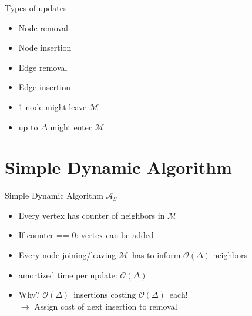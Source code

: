 \documentclass{beamer}
\newcommand{\simple}{$\mathcal{A}_S$}
\newcommand{\M}{$\mathcal{M}$}
\newcommand{\OD}{$\mathcal{O}(\Delta)$}
\begin{document}
\begin{frame}{Types of updates}
  \begin{itemize}
    \item Node removal

    \item Node insertion 
    
    \item Edge removal

    \item Edge insertion

    \bigskip
    \item 1 node might leave \M
    \item up to $\Delta$ might enter \M 
  \end{itemize}
  
\end{frame}


\section{Simple Dynamic Algorithm}
\begin{frame}{Simple Dynamic Algorithm \simple}
  \begin{itemize}
    \item Every vertex has counter of neighbors in \M
    \item If counter == 0: vertex can be added 
    \pause
    \medskip
    \item Every node joining/leaving \M\ has to inform $\mathcal{O}(\Delta)$ neighbors
    \medskip
    \item amortized time per update: \OD
    \pause
    \bigskip
    \item Why? \OD\ insertions costing \OD\ each!
    \\
    \pause
    $\rightarrow$ Assign cost of next insertion to removal
  \end{itemize}
  
\end{frame}
\end{document}
